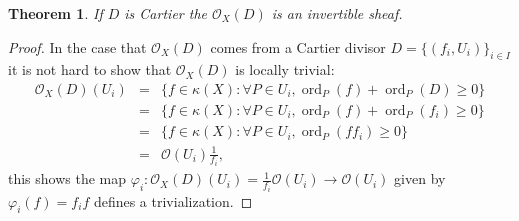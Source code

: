 \documentclass[12pt]{article}
\numberwithin{equation}{section}
\newtheorem{theorem}{Theorem}[subsection]
\theoremstyle{definition}
\theoremstyle{remark}
\newcommand{\Ocal}{\mathcal{O}}
\newcommand{\ord}{\operatorname{ord}}
\begin{document}
\begin{theorem}\label{theorem:cartier-to-invertible}
	If $D$ is Cartier the $\Ocal_X(D)$ is an invertible sheaf.
\end{theorem}
\begin{proof}
	In the case that $\Ocal_X(D)$ comes from a Cartier divisor $D = \lbrace (f_i,U_i) \rbrace_{i\in I}$ it is not hard to show that $\Ocal_X(D)$ is locally trivial:
	\begin{eqnarray*}
		\Ocal_X(D)(U_i) &=& \lbrace f\in \kappa(X) : \forall P\in U_i, \ord_P(f) + \ord_P(D) \geq 0 \rbrace \\
		&=& \lbrace f\in \kappa(X) : \forall P\in U_i, \ord_P(f) + \ord_P(f_i) \geq 0 \rbrace \\
		&=& \lbrace f\in \kappa(X) : \forall P\in U_i, \ord_P(ff_i)\geq 0 \rbrace\\
		&=& \mathcal O(U_i)\frac{1}{f_i},
	\end{eqnarray*}
	this shows the map $\varphi_i:\Ocal_X(D)(U_i) = \frac{1}{f_i}\mathcal O(U_i) \to \mathcal O(U_i)$ given by $ \varphi_i(f) = f_i f$ defines a trivialization.
\end{proof}
\end{document}
